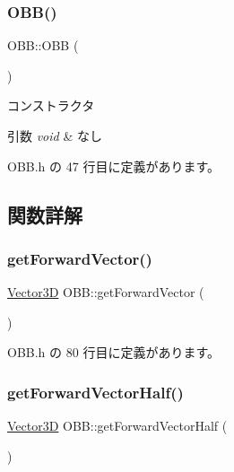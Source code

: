 \subsubsection{\texorpdfstring{O\+B\+B()}{OBB()}}
{\footnotesize\ttfamily O\+B\+B\+::\+O\+BB (\begin{DoxyParamCaption}{ }\end{DoxyParamCaption})\hspace{0.3cm}{\ttfamily [inline]}}



コンストラクタ 


\begin{DoxyParams}{引数}
{\em void} & なし \\
\hline
\end{DoxyParams}


 O\+B\+B.\+h の 47 行目に定義があります。



\subsection{関数詳解}
\mbox{\label{class_o_b_b_a4d839b676caebf6ba4361bb9166e97d3}} 
\subsubsection{\texorpdfstring{get\+Forward\+Vector()}{getForwardVector()}}
{\footnotesize\ttfamily \mbox{\hyperlink{class_vector3_d}{Vector3D}} O\+B\+B\+::get\+Forward\+Vector (\begin{DoxyParamCaption}{ }\end{DoxyParamCaption})\hspace{0.3cm}{\ttfamily [inline]}}



 O\+B\+B.\+h の 80 行目に定義があります。

\mbox{\label{class_o_b_b_a00b6038bdcc374d3acd9ef4d002b59d0}} 
\subsubsection{\texorpdfstring{get\+Forward\+Vector\+Half()}{getForwardVectorHalf()}}
{\footnotesize\ttfamily \mbox{\hyperlink{class_vector3_d}{Vector3D}} O\+B\+B\+::get\+Forward\+Vector\+Half (\begin{DoxyParamCaption}{ }\end{DoxyParamCaption})\hspace{0.3cm}{\ttfamily [inline]}}



